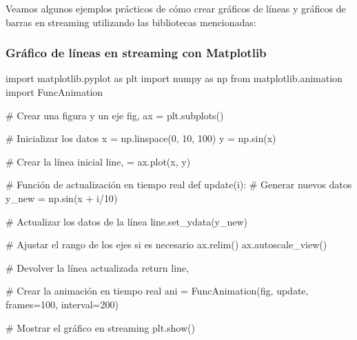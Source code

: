 \documentclass[
  a4paper,
]{article}
\newenvironment{Shaded}{}{}
\newcommand{\CommentTok}[1]{\textcolor[rgb]{0.42,0.45,0.49}{#1}}
\newcommand{\ControlFlowTok}[1]{\textcolor[rgb]{0.84,0.23,0.29}{#1}}
\newcommand{\DecValTok}[1]{\textcolor[rgb]{0.00,0.36,0.77}{#1}}
\newcommand{\ImportTok}[1]{\textcolor[rgb]{0.01,0.18,0.38}{#1}}
\newcommand{\KeywordTok}[1]{\textcolor[rgb]{0.84,0.23,0.29}{#1}}
\newcommand{\NormalTok}[1]{\textcolor[rgb]{0.14,0.16,0.18}{#1}}
\newcommand{\OperatorTok}[1]{\textcolor[rgb]{0.14,0.16,0.18}{#1}}
\begin{document}
Veamos algunos ejemplos prácticos de cómo crear gráficos de líneas y
gráficos de barras en streaming utilizando las bibliotecas mencionadas:

\hypertarget{gruxe1fico-de-luxedneas-en-streaming-con-matplotlib}{%
\subsubsection{Gráfico de líneas en streaming con
Matplotlib}\label{gruxe1fico-de-luxedneas-en-streaming-con-matplotlib}}

\begin{Shaded}
\begin{Highlighting}[]
\ImportTok{import}\NormalTok{ matplotlib.pyplot }\ImportTok{as}\NormalTok{ plt}
\ImportTok{import}\NormalTok{ numpy }\ImportTok{as}\NormalTok{ np}
\ImportTok{from}\NormalTok{ matplotlib.animation }\ImportTok{import}\NormalTok{ FuncAnimation}

\CommentTok{\# Crear una figura y un eje}
\NormalTok{fig, ax }\OperatorTok{=}\NormalTok{ plt.subplots()}

\CommentTok{\# Inicializar los datos}
\NormalTok{x }\OperatorTok{=}\NormalTok{ np.linspace(}\DecValTok{0}\NormalTok{, }\DecValTok{10}\NormalTok{, }\DecValTok{100}\NormalTok{)}
\NormalTok{y }\OperatorTok{=}\NormalTok{ np.sin(x)}

\CommentTok{\# Crear la línea inicial}
\NormalTok{line, }\OperatorTok{=}\NormalTok{ ax.plot(x, y)}

\CommentTok{\# Función de actualización en tiempo real}
\KeywordTok{def}\NormalTok{ update(i):}
    \CommentTok{\# Generar nuevos datos}
\NormalTok{    y\_new }\OperatorTok{=}\NormalTok{ np.sin(x }\OperatorTok{+}\NormalTok{ i}\OperatorTok{/}\DecValTok{10}\NormalTok{)}

    \CommentTok{\# Actualizar los datos de la línea}
\NormalTok{    line.set\_ydata(y\_new)}

    \CommentTok{\# Ajustar el rango de los ejes si es necesario}
\NormalTok{    ax.relim()}
\NormalTok{    ax.autoscale\_view()}

    \CommentTok{\# Devolver la línea actualizada}
    \ControlFlowTok{return}\NormalTok{ line,}

\CommentTok{\# Crear la animación en tiempo real}
\NormalTok{ani }\OperatorTok{=}\NormalTok{ FuncAnimation(fig, update, frames}\OperatorTok{=}\DecValTok{100}\NormalTok{, interval}\OperatorTok{=}\DecValTok{200}\NormalTok{)}

\CommentTok{\# Mostrar el gráfico en streaming}
\NormalTok{plt.show()}
\end{Highlighting}
\end{Shaded}
\end{document}
